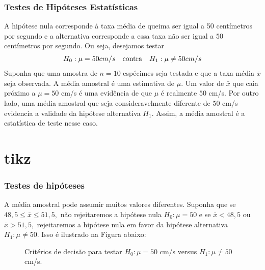 \documentclass[14pt,aspectratio=1610]{beamer}
\begin{document}
\begin{frame}{}
\frametitle{ Testes de Hipóteses Estatísticas}
\begin{block}{}
\justifying
A hipótese nula corresponde à taxa média de queima ser igual a 50 centímetros por segundo e a alternativa corresponde a essa taxa não ser igual a $50$ centímetros 
por segundo. Ou seja, desejamos testar
\begin{align*}
\centering
H_{0}: \mu=50 cm/s &&\textrm{contra}&& H_{1}:\mu \neq 50 cm/s
\end{align*}
Suponha que uma amostra de $n = 10$ espécimes seja testada e que a taxa média $\bar{x}$ seja observada. A média amostral é uma estimativa de $\mu.$ Um valor de 
$\bar{x}$ que caia próximo a $\mu = 50$ cm/s é uma evidência de que $\mu$ é realmente $50$ cm/s. Por outro lado, 
uma média amostral que seja consideravelmente diferente de $50$ cm/s evidencia a validade da hipótese alternativa $H_{1}.$ Assim, a média amostral 
é a estatística de teste nesse caso.
\end{block}
\end{frame}

\section{tikz}
\begin{frame}{}
\frametitle{Testes de hipóteses}
\begin{block}{}
\justifying
A média amostral pode assumir muitos valores diferentes. Suponha que se $48,5 \leq \bar{x}\leq 51,5,$ não rejeitaremos a hipótese nula $H_{0}:\mu = 50$ e se 
$\bar{x} < 48,5$ ou $\bar{x} > 51,5,$ rejeitaremos a hipótese nula em favor da hipótese alternativa $H_{1}:\mu \neq 50.$ Isso é ilustrado na Figura abaixo:
 \end{block}\pause
\begin{block}{}
\begin{figure}
\centering
{}
\caption{Critérios de decisão para testar $H_{0}:\mu = 50$ cm/s versus $H_{1}: \mu \neq 50$ cm/s.} \label{fig:M1}
\end{figure}
 \end{block}
\end{frame}
\end{document}

